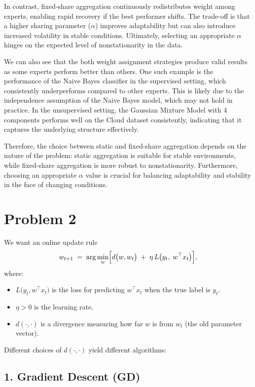 \documentclass{article}
\begin{document}
In contrast, fixed‐share aggregation continuously redistributes weight among experts, enabling rapid recovery if the best performer shifts. The trade-off is that a higher sharing parameter ($\alpha$) improves adaptability but can also introduce increased volatility in stable conditions. Ultimately, selecting an appropriate $\alpha$ hinges on the expected level of nonstationarity in the data.

We can also see that the both weight assignment strategies produce valid results as some experts perform better than others. One such example is the performance of the Naive Bayes classifier in the supervised setting, which consistently underperforms compared to other experts. This is likely due to the independence assumption of the Naive Bayes model, which may not hold in practice. In the unsupervised setting, the Gaussian Mixture Model with 4 components performs well on the Cloud dataset consistently, indicating that it captures the underlying structure effectively.

Therefore, the choice between static and fixed-share aggregation depends on the nature of the problem: static aggregation is suitable for stable environments, while fixed-share aggregation is more robust to nonstationarity. Furthermore, choosing an appropriate $\alpha$ value is crucial for balancing adaptability and stability in the face of changing conditions.

\newpage
\section*{Problem 2}

We want an online update rule
\[
  w_{t+1}
  \;=\;
  \arg\min_{w}
  \Bigl[
    d\bigl(w,w_{t}\bigr)
    \;+\;
    \eta\,L\bigl(y_t,\;w^\top x_t\bigr)
  \Bigr],
\]
where:
\begin{itemize}
\item $L\bigl(y_t, w^\top x_t\bigr)$ is the loss for predicting $w^\top x_t$ when the true label is $y_t$.
\item $\eta>0$ is the learning rate.
\item $d(\cdot,\cdot)$ is a divergence measuring how far $w$ is from $w_t$ (the old parameter vector).
\end{itemize}
Different choices of $d(\cdot,\cdot)$ yield different algorithms:

\subsection*{1. Gradient Descent (GD)}
\end{document}

